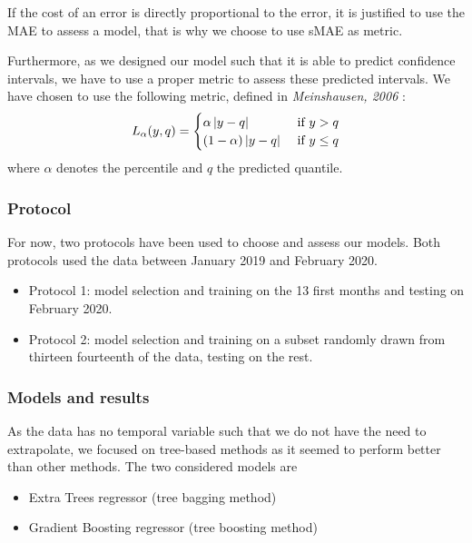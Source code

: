 \documentclass[a4paper, 12pt]{article}
\begin{document}
    If the cost of an error is directly proportional to the error, it is justified to use the MAE to assess a model, that is why we choose to use sMAE as metric.
    
    Furthermore, as we designed our model such that it is able to predict confidence intervals, we have to use a proper metric to assess these predicted intervals. We have chosen to use the following metric, defined in \emph{Meinshausen, 2006} \cite{meinshausen2006quantile} :
    \begin{equation*}
        L_\alpha(y, q) = \begin{cases}\alpha \left|y - q\right| & \text{ if } y > q \\ (1 - \alpha) \left|y - q\right| & \text{ if } y \leq q\end{cases}
    \end{equation*}
    where $\alpha$ denotes the percentile and $q$ the predicted quantile.

    \subsubsection{Protocol}
    
    For now, two protocols have been used to choose and assess our models. Both protocols used the data between January 2019 and February 2020.  
    \begin{itemize}
        \item Protocol 1: model selection and training on the 13 first months and testing on  February 2020.
        \item Protocol 2: model selection and training on a subset randomly drawn from thirteen fourteenth of the data, testing on the rest.
    \end{itemize}

    \subsubsection{Models and results}
    
    As the data has no temporal variable such that we do not have the need to extrapolate, we focused on tree-based methods as it seemed to perform better than other methods. The two considered models are 
    \begin{itemize}
        \item Extra Trees regressor (tree bagging method)
        \item Gradient Boosting regressor (tree boosting method)
    \end{itemize}
    
\end{document}
